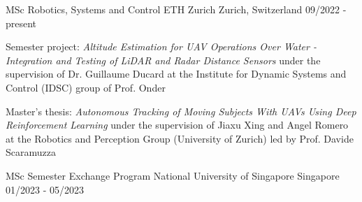

\begin{cventries}

  \cventry
    {MSc Robotics, Systems and Control} %
    {ETH Zurich} %
    {Zurich, Switzerland} %
    {09/2022 - present} %
    {
      \begin{cvitems} %
        \item Semester project: \textit{Altitude Estimation for UAV Operations Over Water - Integration and Testing of LiDAR and
        Radar Distance Sensors} under the supervision of Dr. Guillaume Ducard at the Institute for Dynamic Systems and Control (IDSC) group of Prof. Onder
        \item Master's thesis: \textit{Autonomous Tracking of Moving Subjects With UAVs Using Deep Reinforcement Learning} under the supervision of Jiaxu Xing and Angel Romero at the Robotics and Perception Group (University of Zurich) led by Prof. Davide Scaramuzza
      \end{cvitems}
    }

  \cventry
  {MSc Semester Exchange Program} %
  {National University of Singapore} %
  {Singapore} %
  {01/2023 - 05/2023} %
  {
  }


\end{cventries}
